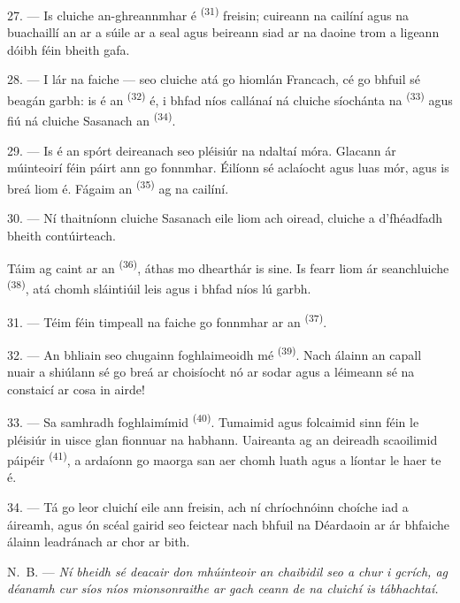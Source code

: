 \VUsaut{5.0mm}
\VUsaut{3.4mm}

27. --- Is cluiche an-ghreannmhar é  \textsuperscript{(31)} freisin;
cuireann na cailíní agus na buachaillí an  ar a súile ar a seal agus
beireann siad ar na daoine trom a ligeann dóibh féin bheith gafa.

28. --- I lár na faiche --- seo cluiche atá go hiomlán Francach, cé go bhfuil sé
beagán garbh: is é an  \textsuperscript{(32)} é, i bhfad níos
callánaí ná cluiche síochánta na  \textsuperscript{(33)} agus
fiú ná cluiche Sasanach an  \textsuperscript{(34)}.

29. --- Is é an spórt deireanach seo pléisiúr na ndaltaí móra. Glacann ár
múinteoirí féin páirt ann go fonnmhar. Éilíonn sé aclaíocht agus luas mór, agus is
breá liom é. Fágaim an  \textsuperscript{(35)} ag na cailíní.

30. --- Ní thaitníonn cluiche Sasanach eile liom ach oiread, cluiche a d'fhéadfadh
bheith contúirteach.

Táim ag caint ar an  \textsuperscript{(36)}, áthas mo dhearthár is
sine. Is fearr liom ár seanchluiche 
\textsuperscript{(38)}, atá chomh sláintiúil leis agus i bhfad níos lú garbh.

\VUsaut{4.6mm}
\VUsaut{3.0mm}

31. --- Téim féin timpeall na faiche go fonnmhar ar an 
\textsuperscript{(37)}.

32. --- An bhliain seo chugainn foghlaimeoidh mé 
\textsuperscript{(39)}. Nach álainn an capall nuair a shiúlann sé go breá ar
choisíocht nó ar sodar agus a léimeann sé na constaicí ar cosa in airde!

33. --- Sa samhradh foghlaimímid  \textsuperscript{(40)}.
Tumaimid agus folcaimid sinn féin le pléisiúr in uisce glan fionnuar na habhann.
Uaireanta ag an deireadh scaoilimid  páipéir \textsuperscript{(41)},
a ardaíonn go maorga san aer chomh luath agus a líontar le haer te é.

34. --- Tá go leor cluichí eile ann freisin, ach ní chríochnóinn choíche iad a
áireamh, agus ón scéal gairid seo feictear nach bhfuil na Déardaoin ar ár bhfaiche
álainn leadránach ar chor ar bith.

N.~B. --- \textit{Ní bheidh sé deacair don mhúinteoir an chaibidil seo a chur i
gcrích, ag déanamh cur síos níos mionsonraithe ar gach ceann de na cluichí is
tábhachtaí.}
\VUsaut{6.0mm}
\VUfilet{22mm}
